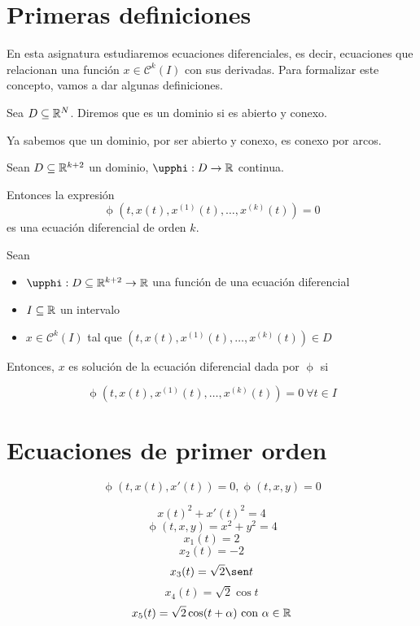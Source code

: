
\section{Primeras definiciones}

En esta asignatura estudiaremos ecuaciones diferenciales, es decir, ecuaciones que relacionan una función $x \in \mathcal{C}^k(I)$
con sus derivadas. Para formalizar este concepto, vamos a dar algunas definiciones.

\begin{ndef}[Dominio]
  Sea $D \subseteq \mathbb{R}^N$. Diremos que es un dominio si es abierto y conexo.
\end{ndef}

Ya sabemos que un dominio, por ser abierto y conexo, es conexo por arcos.

\begin{ndef}
  Sean $D \subseteq \mathbb{R}^{k+2}$ un dominio, $\upphi : D \to \R$ continua.

  Entonces la expresión
  \[\upphi(t, x(t), x^{(1)}(t), \dots, x^{(k)}(t)) = 0\]
  es una ecuación diferencial de orden $k$.
\end{ndef}

\begin{ndef}
  Sean 
  \begin{itemize}
  \item $\upphi : D \subseteq \R^{k+2} \to \R$ una función de una ecuación diferencial
  \item $I \subseteq \mathbb{R}$ un intervalo
  \item $x \in \mathcal{C}^k(I)$ tal que $(t, x(t), x^{(1)}(t), \dots, x^{(k)}(t)) \in D$
  \end{itemize}

  Entonces, $x$ es solución de la ecuación diferencial dada por $\upphi$ si

  \[
    \upphi(t, x(t), x^{(1)}(t), \dots, x^{(k)}(t)) = 0 \ \forall t \in I
  \]
\end{ndef}

\section{Ecuaciones de primer orden}
\[ \upphi(t, x(t), x'(t)) = 0,   \upphi(t,x,y) = 0  \]

\begin{ejemplo}
\[x(t)^2 + x'(t)^2 = 4 \]
\[ \upphi(t,x,y) = x^2+y^2 = 4\]
\[ x_1(t) = 2 \]
\[ x_2(t) = -2 \]
\[ x_3(t) = \sqrt{2}\sen t \]
\[ x_4(t) = \sqrt{2}\cos t \]
\[ x_5(t) = \sqrt{2}\cos(t+\alpha) \text{ con } \alpha\in\mathbb{R} \]
\end{ejemplo}

